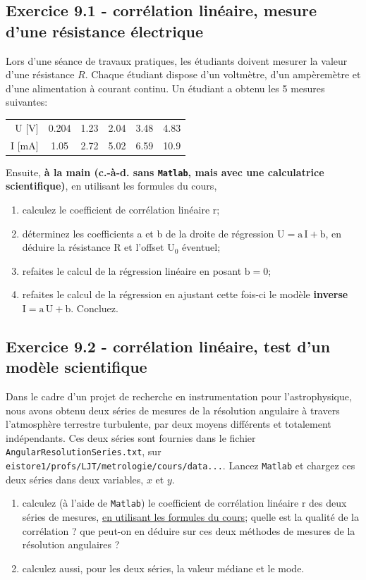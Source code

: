 \subsection*{Exercice 9.1 - corrélation linéaire, mesure d'une résistance électrique}

Lors d'une séance de travaux pratiques, les étudiants doivent mesurer la valeur d'une résistance $R$. Chaque étudiant dispose d'un voltmètre, d'un ampèremètre et d'une alimentation à courant continu. Un étudiant a obtenu les 5 mesures suivantes:
\begin{center}
    \begin{tabular}{r|ccccc}
        U [V]  & 0.204 & 1.23 & 2.04 & 3.48 & 4.83 \\
        I [mA] & 1.05  & 2.72 & 5.02 & 6.59 & 10.9
    \end{tabular}
\end{center}

Ensuite, \textbf{à la main (c.-à-d. sans \texttt{Matlab}, mais avec une calculatrice scientifique)}, en utilisant les formules du cours,
\begin{enumerate}
    \item calculez le coefficient de corrélation linéaire r;
    \item déterminez les coefficients a et b de la droite de régression $\text{U}=\text{a}\,\text{I}+\text{b}$, en déduire la résistance R et l'offset $\text{U}_0$ éventuel;
    \item refaites le calcul de la régression linéaire en posant $\text{b}=0$;
    \item refaites le calcul de la régression en ajustant cette fois-ci le modèle \textbf{inverse} $\text{I}=\text{a}\,\text{U}+\text{b}$. Concluez.
\end{enumerate}

\subsection*{Exercice 9.2 - corrélation linéaire, test d'un modèle scientifique}

Dans le cadre d'un projet de recherche en instrumentation pour l'astrophysique, nous avons obtenu deux séries de mesures de la résolution angulaire à travers l'atmosphère terrestre turbulente, par deux moyens différents et totalement indépendants. Ces deux séries sont fournies dans le fichier \texttt{AngularResolutionSeries.txt}, sur \newline
\texttt{eistore1/profs/LJT/metrologie/cours/data...}. Lancez \texttt{Matlab} et chargez ces deux séries dans deux variables, $x$ et $y$.
\begin{enumerate}
    \item calculez (à l'aide de \texttt{Matlab}) le coefficient de corrélation linéaire r des deux séries de mesures, \underline{en utilisant les formules du cours}; quelle est la qualité de la corrélation ? que peut-on en déduire sur ces deux méthodes de mesures de la résolution angulaires ?
    \item calculez aussi, pour les deux séries, la valeur médiane et le mode.
\end{enumerate}

